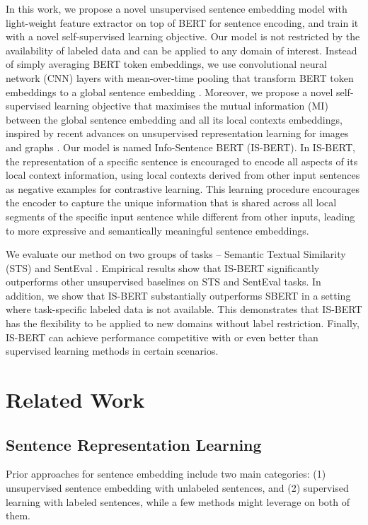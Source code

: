 \documentclass[11pt,a4paper]{article}
\begin{document}
In this work, we propose a novel unsupervised sentence embedding model with light-weight feature extractor on top of BERT for sentence encoding, and train it with a novel self-supervised learning objective. Our model is not restricted by the availability of labeled data and can be applied to any domain of interest. Instead of simply averaging BERT token embeddings, we use convolutional neural network (CNN) layers with mean-over-time pooling that transform BERT token embeddings to a global sentence embedding \cite{kim2014convolutional}. Moreover, we propose a novel self-supervised learning objective that maximises the mutual information (MI) between the global sentence embedding and all its local contexts embeddings, inspired by recent advances on unsupervised representation learning for images and graphs \citep{hjelm2019,Velickovic2018DeepGI}. Our model is named Info-Sentence BERT (IS-BERT). In IS-BERT, the representation of a specific sentence is encouraged to encode all aspects of its local context information, using local contexts derived from other input sentences as negative examples for contrastive learning. This learning procedure encourages the encoder to capture the unique information that is shared across all local segments of the specific input sentence while different from other inputs, leading to more expressive and semantically meaningful sentence embeddings. 
 
We evaluate our method on two groups of tasks -- Semantic Textual Similarity (STS) and SentEval \cite{conneau2018}. Empirical results show that IS-BERT significantly outperforms other unsupervised baselines on STS and SentEval tasks. 
In addition, we show that IS-BERT substantially outperforms SBERT in a setting where task-specific labeled data is not available. This demonstrates that IS-BERT has the flexibility to be applied to new domains without label restriction. Finally, IS-BERT can achieve performance competitive with or even better than supervised learning methods in certain scenarios. 
  \section{Related Work}\label{sec: related-work}










\subsection{Sentence Representation Learning}
Prior approaches for sentence embedding include two main categories: (1) unsupervised sentence embedding with unlabeled sentences, and (2) supervised learning with labeled sentences, while a few methods might leverage on both of them. 
\end{document}
